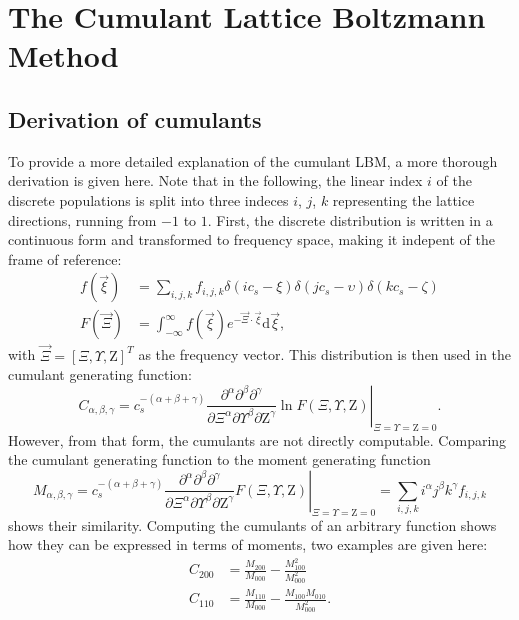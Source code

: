 \chapter{The Cumulant Lattice Boltzmann Method}
\label{app:cumulant}
\section{Derivation of cumulants}
To provide a more detailed explanation of the cumulant LBM, a more thorough derivation is given here. Note that in the following, the linear index $i$ of the discrete populations is split into three indeces $i$, $j$, $k$ representing the lattice directions, running from $-1$ to $1$. First, the discrete distribution is written in a continuous form and transformed to frequency space, making it indepent of the frame of reference:
\begin{align}
f(\vec{\xi}) &= \sum_{i,j,k} f_{i,j,k} \delta(ic_s - \xi) \delta(jc_s - \upsilon) \delta(kc_s - \zeta) \label{eq:contin}\\
F(\vec{\Xi}) &= \int_{-\infty}^{\infty}f(\vec{\xi})e^{-\vec{\Xi} \cdot \vec{\xi}} \mathrm{d}\vec{\xi}, \label{eq:cum_laplace}
\end{align}
with $\vec{\Xi} = [\Xi, \Upsilon, \mathrm{Z}]^T$ as the frequency vector. This distribution is then used in the cumulant generating function:
\begin{equation}
	C_{\alpha,\beta,\gamma} = c_s^{-(\alpha+\beta+\gamma)} \left. \frac{\partial^\alpha \partial^\beta \partial^\gamma}{\partial \Xi^\alpha \partial \Upsilon^\beta \partial \mathrm{Z}^\gamma} \ln F(\Xi, \Upsilon, \mathrm{Z})\right|_{\Xi=\Upsilon=\mathrm{Z}=0}. \label{eq:cum}
\end{equation} However, from that form, the cumulants are not directly computable. Comparing the cumulant generating function to the moment generating function
\begin{equation}
	M_{\alpha, \beta, \gamma} = c_s^{-(\alpha+\beta+\gamma)} \left. \frac{\partial^\alpha \partial^\beta \partial^\gamma}{\partial \Xi^\alpha \partial \Upsilon^\beta \partial \mathrm{Z}^\gamma} F(\Xi, \Upsilon, \mathrm{Z}) \right|_{\Xi=\Upsilon=\mathrm{Z}=0} = \sum_{i,j,k} i^\alpha j^\beta k^\gamma f_{i,j,k} \label{eq:moments}
\end{equation} shows their similarity. Computing the cumulants of an arbitrary function shows how they can be expressed in terms of moments, two examples are given here:
\begin{align}
	C_{200} &= \frac{M_{200}}{M_{000}} - \frac{M_{100}^2}{M_{000}^2} \label{eq:c_200}\\
	C_{110} &= \frac{M_{110}}{M_{000}} - \frac{M_{100} M_{010}}{M_{000}^2}. \label{eq:c_110}
\end{align}
